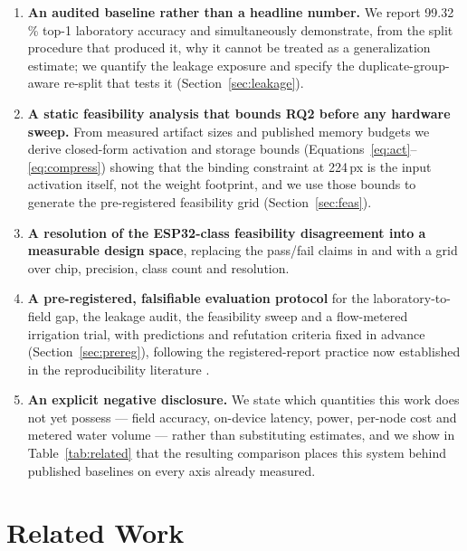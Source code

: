 \documentclass[journal]{IEEEtran}
\begin{document}
\begin{enumerate}
\item \textbf{An audited baseline rather than a headline number.} We report
99.32\,\% top-1 laboratory accuracy and simultaneously demonstrate, from
the split procedure that produced it, why it cannot be treated as a
generalization estimate; we quantify the leakage exposure and specify the
duplicate-group-aware re-split that tests it (Section~\ref{sec:leakage}).

\item \textbf{A static feasibility analysis that bounds RQ2 before any
hardware sweep.} From measured artifact sizes and published memory budgets
we derive closed-form activation and storage bounds
(Equations~\ref{eq:act}--\ref{eq:compress}) showing that the binding
constraint at 224\,px is the input activation itself, not the weight
footprint, and we use those bounds to generate the pre-registered
feasibility grid (Section~\ref{sec:feas}).

\item \textbf{A resolution of the ESP32-class feasibility disagreement into
a measurable design space}, replacing the pass/fail claims in
\cite{nyakuri2025aiiot} and \cite{samanta2024leafsense} with a grid over
chip, precision, class count and resolution.

\item \textbf{A pre-registered, falsifiable evaluation protocol} for the
laboratory-to-field gap, the leakage audit, the feasibility sweep and a
flow-metered irrigation trial, with predictions and refutation criteria
fixed in advance (Section~\ref{sec:prereg}), following the registered-report
practice now established in the reproducibility literature
\cite{nosek2018preregistration,chambers2013registered,munafo2017manifesto}.

\item \textbf{An explicit negative disclosure.} We state which quantities
this work does not yet possess --- field accuracy, on-device latency,
power, per-node cost and metered water volume --- rather than substituting
estimates, and we show in Table~\ref{tab:related} that the resulting
comparison places this system behind published baselines on every axis
already measured.
\end{enumerate}

\section{Related Work}
\label{sec:related}
\end{document}
